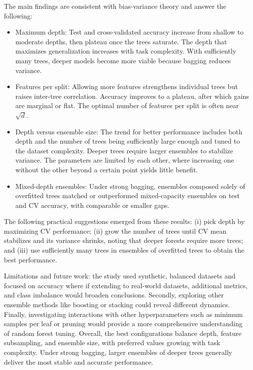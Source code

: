 \documentclass[conference]{IEEEtran}
\begin{document}
The main findings are consistent with bias-variance theory and answer the following:
\begin{itemize}
  \item Maximum depth: Test and cross-validated accuracy increase from shallow to moderate depths, then plateau once the trees saturate. The depth that maximizes generalization increases with task complexity. With sufficiently many trees, deeper models become more viable because bagging reduces variance.
  \item Features per split: Allowing more features strengthens individual trees but raises inter-tree correlation. Accuracy improves to a plateau, after which gains are marginal or flat. The optimal number of features per split is often near $\sqrt{d}$.
  \item Depth versus ensemble size: The trend for better performance includes both depth and the number of trees being sufficiently large enough and tuned to the dataset complexity. Deeper trees require larger ensembles to stabilize variance. The parameters are limited by each other, where increasing one without the other beyond a certain point yields little benefit.
  \item Mixed-depth ensembles: Under strong bagging, ensembles composed solely of overfitted trees matched or outperformed mixed-capacity ensembles on test and CV accuracy, with comparable or smaller gaps. 
\end{itemize}

The following practical suggestions emerged from these results: (i) pick depth by maximizing CV performance; (ii) grow the number of trees until CV mean stabilizes and its variance shrinks, noting that deeper forests require more trees; and (iii) use sufficiently many trees in ensembles of overfitted trees to obtain the best performance.

Limitations and future work: the study used synthetic, balanced datasets and focused on accuracy where if extending to real-world datasets, additional metrics, and class imbalance would broaden conclusions. Secondly, exploring other ensemble methods like boosting or stacking could reveal different dynamics. Finally, investigating interactions with other hyperparameters such as minimum samples per leaf or pruning would provide a more comprehensive understanding of random forest tuning.
Overall, the best configurations balance depth, feature subsampling, and ensemble size, with preferred values growing with task complexity. Under strong bagging, larger ensembles of deeper trees generally deliver the most stable and accurate performance.
\end{document}

